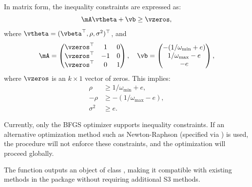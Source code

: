 \documentclass[english,12pt]{book}\usepackage[]{graphicx}\usepackage[]{xcolor}
\begin{document}
In matrix form, the inequality constraints are expressed as:
\begin{equation*}
 \mA\vtheta + \vb \geq \vzeros, 
\end{equation*}
%
where $\vtheta = (\vbeta ^\top, \rho, \sigma^2)^\top$, and 
\begin{equation*}
\mA  = \begin{pmatrix}
      \vzeros^\top& 1 & 0 \\
      \vzeros^\top&  -1 & 0 \\
      \vzeros^\top& 0& 1
      \end{pmatrix}, \quad\quad \\
\vb  = \begin{pmatrix}
       - (1 /\omega_{\textrm{min}}  + e) \\
       1 / \omega_{\textrm{max}} -e \\
       - e
      \end{pmatrix}, 
\end{equation*}
%
where $\vzeros$ is an $k\times 1$ vector of zeros. This implies:
\begin{align*}
\rho & \geq 1 /\omega_{\textrm{min}} + e, \\
-\rho & \geq - (1 /\omega_{\textrm{max}} - e), \\
\sigma^2 & \geq e.
\end{align*}

Currently, only the BFGS optimizer supports inequality constraints. If an alternative optimization method such as Newton-Raphson (specified via ) is used, the procedure will not enforce these constraints, and the optimization will proceed globally.

The function outputs an object of class , making it compatible with existing methods in the  package without requiring additional S3 methods.
\end{document}
